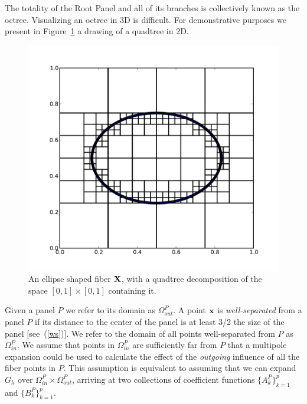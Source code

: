 The totality of the Root Panel  and all of its branches is collectively known as the octree. Visualizing an octree in 3D is difficult. For demonstrative purposes we present  in Figure~\ref{fig:PanelDecomp} a drawing of a quadtree in 2D.
\begin{figure}[!b]
  \begin{center}
    \includegraphics[bb=0in 0in 7.7in 6.3in,width=4.8in,clip]{Images_Methodology/Panels.pdf}
  \end{center}
  \caption{\small An ellipse shaped fiber $\mathbf{X}$, with a quadtree decomposition of the space $[0,1]\times [0,1]$ containing it.}
  \label{fig:PanelDecomp}
\end{figure}

Given a panel $P$ we refer to its domain as $\Omega_{out}^P$.
A point $\mathbf{x}$ is {\em well-separated} from a panel $P$ if  its  distance to the center of the panel is at least 3/2 the size of the panel [see~(\ref{ws})].
We refer to the domain of all points well-separated from $P$ as $\Omega_{in}^P$.
We assume that points in $\Omega_{in}^P$ are sufficiently far from $P$ that a multipole expansion could be used to calculate the effect of the {\em outgoing} influence of all the fiber points in $P$.  This assumption is equivalent to assuming that we can expand $G_h$ over $\Omega_{in}^P\times\Omega_{out}^P$, arriving at two collections of coefficient functions $\{A_k^P\}_{k=1}^p$ and $\{B_k^P\}_{k=1}^p$. 

